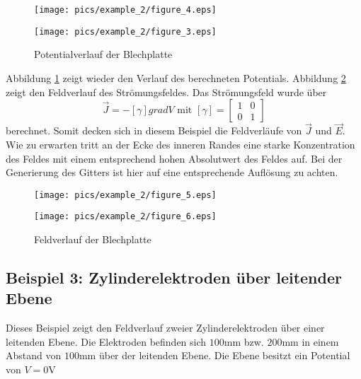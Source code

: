 \begin{figure}[htbp]
	\begin{minipage}{0.5\textwidth}
		\texttt{[image: pics/example\_2/figure\_4.eps]}
	\end{minipage}
	\begin{minipage}{0.5\textwidth}
		\texttt{[image: pics/example\_2/figure\_3.eps]}
	\end{minipage}
	\caption{Potentialverlauf der Blechplatte}
	\label{fig:metal_plate_potential}
\end{figure}

Abbildung \ref{fig:metal_plate_potential} zeigt wieder den Verlauf des berechneten Potentials.\newline
Abbildung \ref{fig:metal_plate_field} zeigt den Feldverlauf des Strömungsfeldes. Das Strömungsfeld wurde über \begin{equation}
\vec{J} = -[\gamma] \mathit{grad}V \text{ mit } [\gamma] = \begin{bmatrix}1 & 0 \\ 0 & 1\end{bmatrix}
\end{equation}berechnet. Somit decken sich in diesem Beispiel die Feldverläufe von $\vec{J}$ und $\vec{E}$.\newline
Wie zu erwarten tritt an der Ecke des inneren Randes eine starke Konzentration des Feldes mit einem entsprechend hohen Absolutwert des Feldes auf. Bei der Generierung des Gitters ist hier auf eine entsprechende Auflösung zu achten.
\begin{figure}[htbp]
	\begin{minipage}{0.5\textwidth}
		\texttt{[image: pics/example\_2/figure\_5.eps]}
	\end{minipage}
	\begin{minipage}{0.5\textwidth}
		\texttt{[image: pics/example\_2/figure\_6.eps]}
	\end{minipage}
	\caption{Feldverlauf der Blechplatte}
	\label{fig:metal_plate_field}
\end{figure}


\subsection{Beispiel 3: Zylinderelektroden über leitender Ebene}
Dieses Beispiel zeigt den Feldverlauf zweier Zylinderelektroden über einer leitenden Ebene. Die Elektroden befinden sich $100 \si{\milli\meter}$ bzw. $200 \si{\milli\meter}$ in einem Abstand von $100 \si{\milli\meter}$ über der leitenden Ebene. Die Ebene besitzt ein Potential von $V = 0 \si{\volt}$

